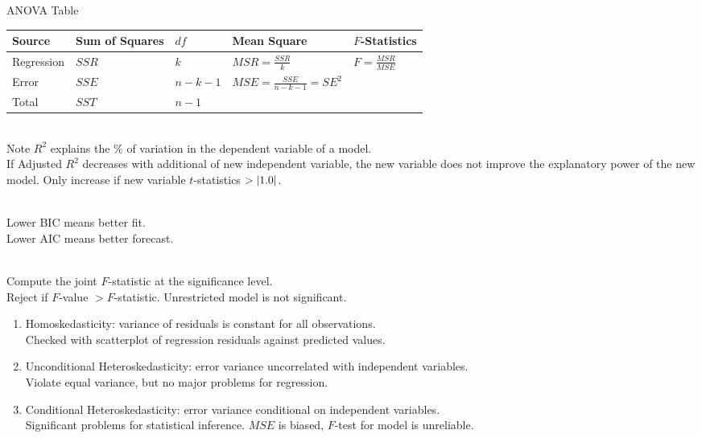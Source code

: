 ANOVA Table\\
\begin{tabularx}{\textwidth}{X|X|X|p{12em}|X}
\hline
\rowcolor{gray!30}
Source & Sum of Squares & $df$ & Mean Square & $F$-Statistics \\
\hline
Regression & $SSR$ & $k$ & $MSR = \frac{SSR}{k}$ & $F = \frac{MSR}{MSE}$ \\
Error & $SSE$ & $n-k-1$ & $MSE = \frac{SSE}{n-k-1} = SE^2$ & \\
Total & $SST$ & $n-1$ & &\\
\hline
\end{tabularx}

\begin{definition} \\
Note $R^2$ explains the $\%$ of variation in the dependent variable of a model.\\
If Adjusted $R^2$ decreases with additional of new independent variable, the new variable does not improve the explanatory power of the new model. Only increase if new variable $t$-statistics $> \left\lvert1.0\right\rvert$.
\end{definition}

\begin{method} \\
Lower BIC means better fit.\\
Lower AIC means better forecast.
\end{method}

\begin{method} \\
Compute the joint $F$-statistic at the significance level.\\
Reject if $F$-value $> F$-statistic. Unrestricted model is not significant.
\end{method}

\begin{method} 
\begin{enumerate}[label=\roman*.]
\setlength{\itemsep}{0pt}
\item Homoskedasticity: variance of residuals is constant for all observations.\\
Checked with scatterplot of regression residuals against predicted values.
\item Unconditional Heteroskedasticity: error variance uncorrelated with independent variables.\\
Violate equal variance, but no major problems for regression.
\item Conditional Heteroskedasticity: error variance conditional on independent variables.\\
Significant problems for statistical inference. $MSE$ is biased, $F$-test for model is unreliable.
\end{enumerate}
\end{method}

